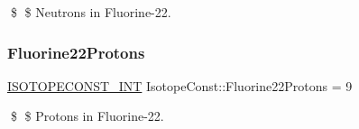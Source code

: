 \$ \$ Neutrons in Fluorine-\/22. \mbox{\label{group___isotope_const-_fluorine-_f22_ga9c431ed376681b993c250fc530d51812}} 
\subsubsection{\texorpdfstring{Fluorine22\+Protons}{Fluorine22Protons}}
{\footnotesize\ttfamily \mbox{\hyperlink{group___isotope_const-_macros_ga5f18360b3e99483a35c32d789e62621c}{I\+S\+O\+T\+O\+P\+E\+C\+O\+N\+S\+T\+\_\+\+I\+NT}} Isotope\+Const\+::\+Fluorine22\+Protons = 9}

\$ \$ Protons in Fluorine-\/22. 